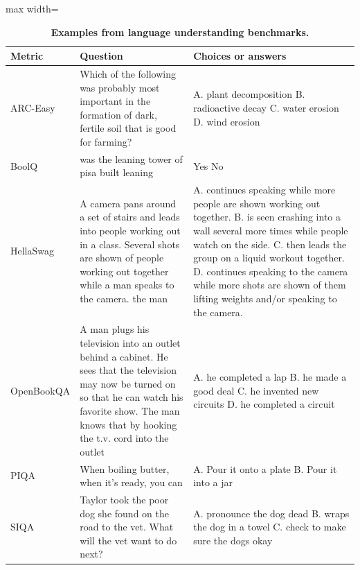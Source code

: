 \documentclass{article} %
\begin{document}
\begin{table}[t!]
    \centering
    \caption{\textbf{Examples from language understanding benchmarks.} }
    \label{tab:app_evaluation_metric_examples}
    \begin{adjustbox}{max width=\textwidth}
    \begin{tabular}{lp{7cm}p{9cm}}
        \toprule
        Metric & Question & Choices or answers\\
        \midrule
        ARC-Easy & Which of the following was probably most important in the formation of dark, fertile soil that is good for farming? & A. plant decomposition \newline B. radioactive decay \newline C. water erosion \newline D. wind erosion \\
        \midrule
        BoolQ & was the leaning tower of pisa built leaning & Yes \newline No \\
        \midrule
        HellaSwag & A camera pans around a set of stairs and leads into people working out in a class. Several shots are shown of people working out together while a man speaks to the camera. the man & A. continues speaking while more people are shown working out together. \newline B. is seen crashing into a wall several more times while people watch on the side. \newline C. then leads the group on a liquid workout together. \newline D. continues speaking to the camera while more shots are shown of them lifting weights and/or speaking to the camera. \\ 
        \midrule
        OpenBookQA & A man plugs his television into an outlet behind a cabinet. He sees that the television may now be turned on so that he can watch his favorite show. The man knows that by hooking the t.v. cord into the outlet & A. he completed a lap \newline B. he made a good deal \newline C. he invented new circuits \newline D. he completed a circuit \\
        \midrule
        PIQA & When boiling butter, when it's ready, you can & A. Pour it onto a plate \newline B. Pour it into a jar \\
        \midrule
        SIQA & Taylor took the poor dog she found on the road to the vet. What will the vet want to do next? & A. pronounce the dog dead \newline B. wraps the dog in a towel \newline C. check to make sure the dogs okay \\

\end{tabular}
\end{adjustbox}
\end{table}
\end{document}
